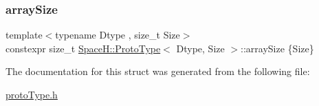 \subsubsection{\texorpdfstring{array\+Size}{arraySize}}
{\footnotesize\ttfamily template$<$typename Dtype , size\+\_\+t Size$>$ \\
constexpr size\+\_\+t \mbox{\hyperlink{struct_space_h_1_1_proto_type}{Space\+H\+::\+Proto\+Type}}$<$ Dtype, Size $>$\+::array\+Size \{Size\}\hspace{0.3cm}{\ttfamily [static]}}



The documentation for this struct was generated from the following file\+:\begin{DoxyCompactItemize}
\item 
\mbox{\hyperlink{proto_type_8h}{proto\+Type.\+h}}\end{DoxyCompactItemize}
